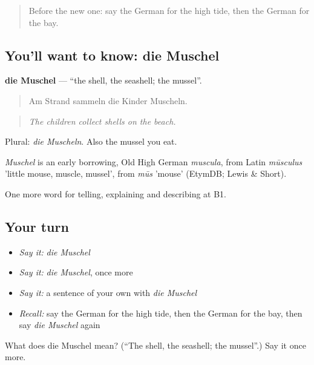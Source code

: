 \label{lesson:GE-C457-muschel}



\begin{quote}
Before the new one: say the German for the high tide, then the German for the bay.
\end{quote}

\subsection*{You'll want to know: die Muschel}
\textbf{die Muschel} — \textquotedblleft{}the shell, the seashell; the mussel\textquotedblright{}.

\begin{quote}
Am Strand sammeln die Kinder Muscheln.
\end{quote}

\begin{quote}
\emph{The children collect shells on the beach.}
\end{quote}

Plural: \emph{die Muscheln}. Also the mussel you eat.

\begin{cousinweb}
\emph{Muschel} is an early borrowing, Old High German \emph{muscula}, from Latin \emph{mūsculus} 'little mouse, muscle, mussel', from \emph{mūs} 'mouse' (EtymDB; Lewis \& Short).
\end{cousinweb}

\begin{grammarlens}[title={What you've built}]
One more word for telling, explaining and describing at B1.
\end{grammarlens}

\subsection*{Your turn}
\begin{itemize}
\raggedright
  \item \emph{Say it:} \emph{die Muschel}
  \item \emph{Say it:} \emph{die Muschel}, once more
  \item \emph{Say it:} a sentence of your own with \emph{die Muschel}
  \item \emph{Recall:} say the German for the high tide, then the German for the bay, then say \emph{die Muschel} again
\end{itemize}

\begin{tcolorbox}[breakable,colback=teal!4,colframe=teal!35!black,title={Before you move on}]
What does die Muschel mean? (\textquotedblleft{}The shell, the seashell; the mussel\textquotedblright{}.) Say it once more.
\end{tcolorbox}
